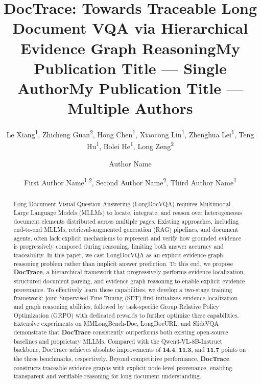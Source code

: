\documentclass[letterpaper]{article} %
\title{DocTrace: Towards Traceable Long Document VQA via Hierarchical Evidence Graph Reasoning}
\author{
    Le Xiang\textsuperscript{\rm 1}\equalcontrib,
    Zhicheng Guan\textsuperscript{\rm 2}\equalcontrib,
    Hong Chen\textsuperscript{\rm 1}\corresponding,
    Xiaocong Lin\textsuperscript{\rm 1},
    Zhenghua Lei\textsuperscript{\rm 1},
    Teng Hu\textsuperscript{\rm 1},
    Bolei He\textsuperscript{\rm 1},
    Long Zeng\textsuperscript{\rm 2}\corresponding
}
\title{My Publication Title --- Single Author}
\author {
    Author Name
}
\title{My Publication Title --- Multiple Authors}
\author {
    First Author Name\textsuperscript{\rm 1,\rm 2}\equalcontrib,
    Second Author Name\textsuperscript{\rm 2}\equalcontrib,
    Third Author Name\textsuperscript{\rm 1}\corresponding
}
\begin{document}
\maketitle

\begin{abstract}



Long Document Visual Question Answering (LongDocVQA) requires Multimodal Large Language Models (MLLMs) to locate, integrate, and reason over heterogeneous document elements distributed across multiple pages. Existing approaches, including end-to-end MLLMs, retrieval-augmented generation (RAG) pipelines, and document agents, often lack explicit mechanisms to represent and verify how grounded evidence is progressively composed during reasoning, limiting both answer accuracy and traceability. In this paper, we cast LongDocVQA as an explicit evidence graph reasoning problem rather than implicit answer prediction. To this end, we propose \textbf{DocTrace}, a hierarchical framework that progressively performs evidence localization, structured document parsing, and evidence graph reasoning to enable explicit evidence provenance. To effectively learn these capabilities, we develop a two-stage training framework: joint Supervised Fine-Tuning (SFT) first initializes evidence localization and graph reasoning abilities, followed by task-specific Group Relative Policy Optimization (GRPO) with dedicated rewards to further optimize these capabilities. Extensive experiments on MMLongBench-Doc, LongDocURL, and SlideVQA demonstrate that \textbf{DocTrace} consistently outperforms both existing open-source baselines and proprietary MLLMs. Compared with the Qwen3-VL-8B-Instruct backbone, DocTrace achieves absolute improvements of {\bf 14.4}, {\bf 11.3}, and {\bf 11.7} points on the three benchmarks, respectively. Beyond competitive performance, \textbf{DocTrace} constructs traceable evidence graphs with explicit node-level provenance, enabling transparent and verifiable reasoning for long document understanding.


\end{abstract}

\end{document}
